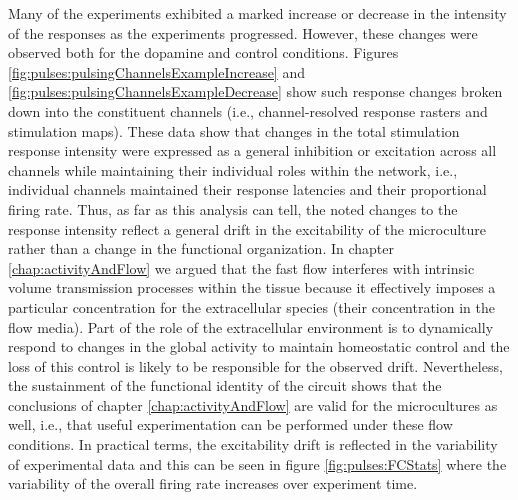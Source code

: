     Many of the experiments exhibited a marked increase or decrease in the intensity of the responses as the experiments progressed. However, these changes were observed both for the dopamine and control conditions. Figures \ref{fig:pulses:pulsingChannelsExampleIncrease} and \ref{fig:pulses:pulsingChannelsExampleDecrease} show such response changes broken down into the constituent channels (i.e., channel-resolved response rasters and stimulation maps). These data show that changes in the total stimulation response intensity were expressed as a general inhibition or excitation across all channels while maintaining their individual roles within the network, i.e., individual channels maintained their response latencies and their proportional firing rate. Thus, as far as this analysis can tell, the noted changes to the response intensity reflect a general drift in the excitability of the microculture rather than a change in the functional organization. In chapter \ref{chap:activityAndFlow} we argued that the fast flow interferes with intrinsic volume transmission processes within the tissue because it effectively imposes a particular concentration for the extracellular species (their concentration in the flow media). Part of the role of the extracellular environment is to dynamically respond to changes in the global activity to maintain homeostatic control and the loss of this control is likely to be responsible for the observed drift. Nevertheless, the sustainment of the functional identity of the circuit shows that the conclusions of chapter \ref{chap:activityAndFlow} are valid for the microcultures as well, i.e., that useful experimentation can be performed under these flow conditions. In practical terms, the excitability drift is reflected in the variability of experimental data and this can be seen in figure \ref{fig:pulses:FCStats} where the variability of the overall firing rate increases over experiment time.

